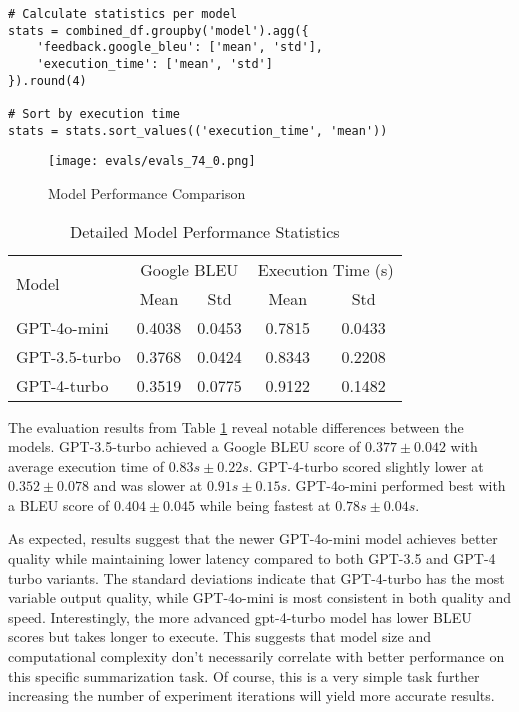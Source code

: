 \begin{verbatim}
# Calculate statistics per model
stats = combined_df.groupby('model').agg({
    'feedback.google_bleu': ['mean', 'std'],
    'execution_time': ['mean', 'std']
}).round(4)

# Sort by execution time
stats = stats.sort_values(('execution_time', 'mean'))
\end{verbatim}

\begin{figure}[h]
\centering
\texttt{[image: evals/evals\_74\_0.png]}
\label{fig:eval-results}
\caption{Model Performance Comparison}
\end{figure}


    
\begin{table}[h]
\centering
\begin{tabular}{lcccc}
\hline
\multirow{2}{*}{Model} & \multicolumn{2}{c}{Google BLEU} & \multicolumn{2}{c}{Execution Time (s)} \\
\cline{2-5}
& Mean & Std & Mean & Std \\
\hline
GPT-4o-mini & 0.4038 & 0.0453 & 0.7815 & 0.0433 \\
GPT-3.5-turbo & 0.3768 & 0.0424 & 0.8343 & 0.2208 \\
GPT-4-turbo & 0.3519 & 0.0775 & 0.9122 & 0.1482 \\
\hline
\end{tabular}
\caption{Detailed Model Performance Statistics}
\label{tab:model-stats}
\end{table}
The evaluation results from Table \ref{tab:model-stats} reveal notable differences between the models. GPT-3.5-turbo achieved a Google BLEU score of $0.377 \pm 0.042$ with average execution time of $0.83s \pm 0.22s$. GPT-4-turbo scored slightly lower at $0.352 \pm 0.078$ and was slower at $0.91s \pm 0.15s$. GPT-4o-mini performed best with a BLEU score of $0.404 \pm 0.045$ while being fastest at $0.78s \pm 0.04s$.

As expected, results suggest that the newer GPT-4o-mini model achieves better quality while maintaining lower latency compared to both GPT-3.5 and GPT-4 turbo variants. The standard deviations indicate that GPT-4-turbo has the most variable output quality, while GPT-4o-mini is most consistent in both quality and speed. Interestingly, the more advanced gpt-4-turbo model has lower BLEU scores but takes longer to execute. This suggests that model size and computational complexity don't necessarily correlate with better performance on this specific summarization task. Of course, this is a very simple task further increasing the number of experiment iterations will yield more accurate results.

